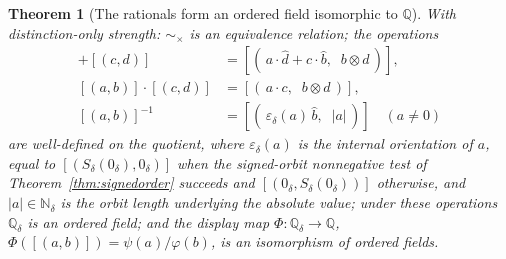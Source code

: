 \documentclass[11pt,a4paper]{article}
\newtheorem{theorem}{Theorem}[section]
\theoremstyle{definition}
\theoremstyle{remark}
\newcommand{\Nd}{\mathbb{N}_\delta}
\newcommand{\Qd}{\mathbb{Q}_\delta}
\newcommand{\Sd}{S_\delta}
\newcommand{\zd}{0_\delta}
\newcommand{\omd}{\otimes}
\begin{document}
\begin{theorem}[The rationals form an ordered field isomorphic to $\mathbb{Q}$]\label{thm:rat}
With distinction-only strength: $\sim_\times$ is an equivalence relation; the
operations
\begin{align}
  [(a, b)] + [(c, d)] &= [(\,a \cdot \widehat{d} + c \cdot \widehat{b},\;\; b \omd d\,)],
    \label{eq:ratadd}\\
  [(a, b)] \cdot [(c, d)] &= [(\,a \cdot c,\;\; b \omd d\,)],
    \label{eq:ratmul}\\
  [(a, b)]^{-1} &= [(\,\varepsilon_\delta(a)\,\widehat{b},\;\; |a|\,)]
    \quad (a \neq 0) \label{eq:ratinv}
\end{align}
are well-defined on the quotient, where $\varepsilon_\delta(a)$ is the internal
orientation of $a$, equal to $[(\Sd(\zd), \zd)]$ when the signed-orbit
nonnegative test of Theorem~\ref{thm:signedorder} succeeds and
$[(\zd, \Sd(\zd))]$ otherwise, and $|a| \in \Nd$ is the orbit length underlying
the absolute value; under these operations $\Qd$ is an ordered field; and the
display map $\Phi \colon \Qd \to \mathbb{Q}$, $\Phi([(a, b)]) = \psi(a) / \varphi(b)$,
is an isomorphism of ordered fields.
\end{theorem}
\end{document}
